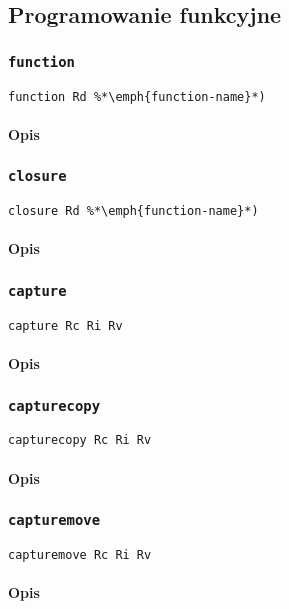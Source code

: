 \subsection{Programowanie funkcyjne}
\label{viua_vm_ops_functional}

\subsubsection{\texttt{function}}

\begin{lstlisting}
function Rd %*\emph{function-name}*)
\end{lstlisting}

\paragraph*{Opis}

\subsubsection{\texttt{closure}}

\begin{lstlisting}
closure Rd %*\emph{function-name}*)
\end{lstlisting}

\paragraph*{Opis}

\subsubsection{\texttt{capture}}

\begin{lstlisting}
capture Rc Ri Rv
\end{lstlisting}

\paragraph*{Opis}

\subsubsection{\texttt{capturecopy}}

\begin{lstlisting}
capturecopy Rc Ri Rv
\end{lstlisting}

\paragraph*{Opis}

\subsubsection{\texttt{capturemove}}

\begin{lstlisting}
capturemove Rc Ri Rv
\end{lstlisting}

\paragraph*{Opis}
